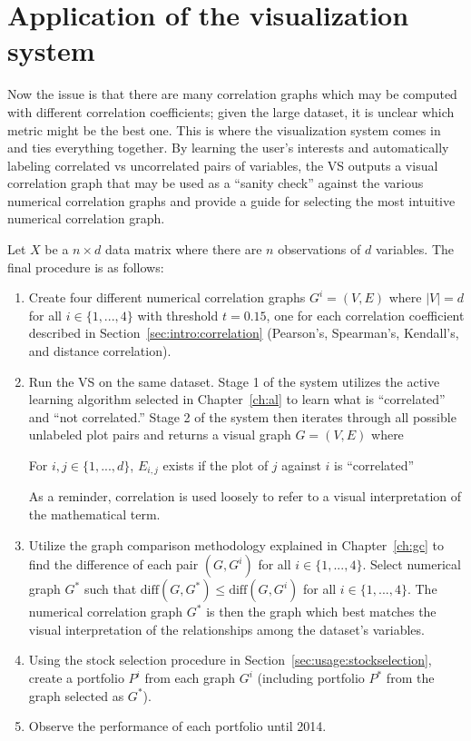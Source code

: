 \section{Application of the visualization system}
\label{sec:usage:newanalysis}

Now the issue is that there are many correlation graphs which may be 
computed with different correlation coefficients; given the large dataset, it 
is unclear which metric might be the best one. This is where the visualization 
system comes in and ties everything together. By learning the user's interests 
and automatically labeling correlated vs uncorrelated pairs of variables, the 
VS outputs a visual correlation graph that may be used as a ``sanity check'' 
against the various numerical correlation graphs and provide a guide for 
selecting the most intuitive numerical correlation graph.

Let $X$ be a $n\times d$ data matrix where there are $n$ observations of $d$ 
variables. The final procedure is as follows:

\tablespacing
\begin{enumerate}
	\item Create four different numerical correlation graphs 
	$G^i=(V,E)$ where $|V| = d$ for all $i\in \{1,...,4\}$ with 
	threshold $t = 0.15$, one for each correlation coefficient described in 
	Section~\ref{sec:intro:correlation} (Pearson's, Spearman's, Kendall's, and 
	distance correlation).
	
	\item Run the VS on the same dataset. Stage 1 of the system utilizes the 
	active learning algorithm selected in Chapter~\ref{ch:al} to learn what is 
	``correlated'' and ``not correlated.'' Stage 2 of the system then iterates 
	through all possible unlabeled plot pairs and returns a visual graph 
	$G=(V,E)$ where 

\begin{algorithm}
	For $i,j\in \{1,...,d\}$, $E_{i,j}$ exists if the plot of $j$ against $i$ 
	is ``correlated''
\end{algorithm}

	As a reminder, correlation is used loosely to refer to a visual 
	interpretation of the mathematical term.

	\item Utilize the graph comparison methodology explained in 
	Chapter~\ref{ch:gc} to find the difference of each pair 
	$(G,G^i)$ for all $i \in \{1,...,4\}$. Select numerical graph $G^*$ such 
	that $\text{diff}(G,G^*) \leq \text{diff}(G,G^i)$ for all $i\in 
	\{1,...,4\}$. The numerical correlation graph $G^*$ is then the graph which 
	best matches the visual interpretation of the relationships among the 
	dataset's variables.
	
	\item Using the stock selection procedure in 
	Section~\ref{sec:usage:stockselection}, create a portfolio $P^i$ from each 
	graph $G^i$ (including portfolio $P^*$ from the graph selected as $G^*$). 
	
	\item Observe the performance of each portfolio until 2014.
\end{enumerate}
\bodyspacing

